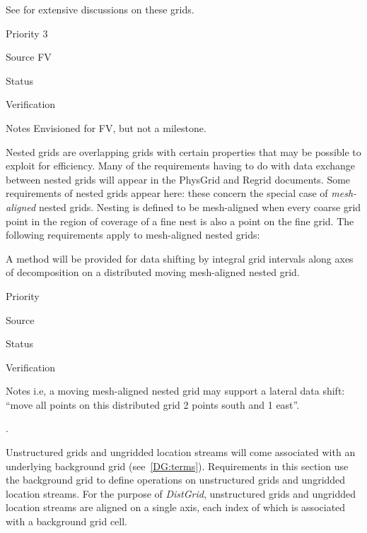 See \cite{art:heikes+:geodesic,art:majewski+:gme} for extensive
discussions on these grids.

\begin{reqlist}
\item[Priority] 3
\item[Source] FV
\item[Status]
\item[Verification]
\item[Notes] Envisioned for FV, but not a milestone.
\end{reqlist}



Nested grids are overlapping grids with certain properties that may be
possible to exploit for efficiency. Many of the requirements having to
do with data exchange between nested grids will appear in the PhysGrid
and Regrid documents. Some requirements of nested grids appear here:
these concern the special case of \emph{mesh-aligned} nested
grids. Nesting is defined to be mesh-aligned when every coarse grid
point in the region of coverage of a fine nest is also a point on the
fine grid. The following requirements apply to mesh-aligned nested
grids:


A method will be provided for data shifting by integral grid intervals
along axes of decomposition on a distributed moving mesh-aligned
nested grid.

\begin{reqlist}
\item[Priority]
\item[Source]
\item[Status]
\item[Verification]
\item[Notes] i.e, a moving mesh-aligned nested grid may support a
  lateral data shift: ``move all points on this distributed grid 2
  points south and 1 east''.
\end{reqlist}

 \label{DG:Unstructured}.

Unstructured grids and ungridded location streams will come associated
with an underlying background grid (see~\ref{DG:terms}). Requirements
in this section use the background grid to define operations on
unstructured grids and ungridded location streams. For the purpose of
\emph{DistGrid}, unstructured grids and ungridded location streams are
aligned on a single axis, each index of which is associated with a
background grid cell.


